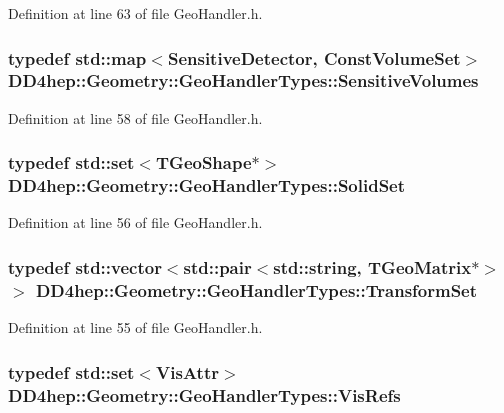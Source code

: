 Definition at line 63 of file GeoHandler.h.\hypertarget{class_d_d4hep_1_1_geometry_1_1_geo_handler_types_a530cdc551e68a5f975fe294329d27e63}{
\subsubsection[{SensitiveVolumes}]{\setlength{\rightskip}{0pt plus 5cm}typedef std::map$<${\bf SensitiveDetector}, {\bf ConstVolumeSet}$>$ {\bf DD4hep::Geometry::GeoHandlerTypes::SensitiveVolumes}}}
\label{class_d_d4hep_1_1_geometry_1_1_geo_handler_types_a530cdc551e68a5f975fe294329d27e63}


Definition at line 58 of file GeoHandler.h.\hypertarget{class_d_d4hep_1_1_geometry_1_1_geo_handler_types_a85d065cdf670a4f9ea9c0c4dee921fce}{
\subsubsection[{SolidSet}]{\setlength{\rightskip}{0pt plus 5cm}typedef std::set$<$TGeoShape$\ast$$>$ {\bf DD4hep::Geometry::GeoHandlerTypes::SolidSet}}}
\label{class_d_d4hep_1_1_geometry_1_1_geo_handler_types_a85d065cdf670a4f9ea9c0c4dee921fce}


Definition at line 56 of file GeoHandler.h.\hypertarget{class_d_d4hep_1_1_geometry_1_1_geo_handler_types_aa52b3113e87db04c37666e85a9b5e569}{
\subsubsection[{TransformSet}]{\setlength{\rightskip}{0pt plus 5cm}typedef std::vector$<$std::pair$<$std::string, TGeoMatrix$\ast$$>$ $>$ {\bf DD4hep::Geometry::GeoHandlerTypes::TransformSet}}}
\label{class_d_d4hep_1_1_geometry_1_1_geo_handler_types_aa52b3113e87db04c37666e85a9b5e569}


Definition at line 55 of file GeoHandler.h.\hypertarget{class_d_d4hep_1_1_geometry_1_1_geo_handler_types_abeb370eb52c06e48c61e6c8bc19b66ab}{
\subsubsection[{VisRefs}]{\setlength{\rightskip}{0pt plus 5cm}typedef std::set$<${\bf VisAttr}$>$ {\bf DD4hep::Geometry::GeoHandlerTypes::VisRefs}}}
\label{class_d_d4hep_1_1_geometry_1_1_geo_handler_types_abeb370eb52c06e48c61e6c8bc19b66ab}


